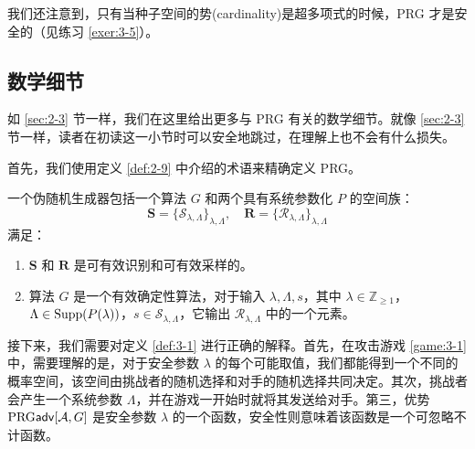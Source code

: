 我们还注意到，只有当种子空间的势(cardinality)是超多项式的时候，PRG 才是安全的（见练习 \ref{exer:3-5}）。

\subsection{数学细节}

如 \ref{sec:2-3} 节一样，我们在这里给出更多与 PRG 有关的数学细节。就像 \ref{sec:2-3} 节一样，读者在初读这一小节时可以安全地跳过，在理解上也不会有什么损失。

首先，我们使用定义 \ref{def:2-9} 中介绍的术语来精确定义 PRG。

\begin{definition}[伪随机生成器]
一个伪随机生成器包括一个算法 $G$ 和两个具有系统参数化 $P$ 的空间族：
\[
\mathbf{S}=\{\mathcal{S}_{\lambda,\Lambda}\}_{\lambda,\Lambda},\quad
\mathbf{R}=\{\mathcal{R}_{\lambda,\Lambda}\}_{\lambda,\Lambda}
\]
满足：
\begin{enumerate}
	\item $\mathbf{S}$ 和 $\mathbf{R}$ 是可有效识别和可有效采样的。
	\item 算法 $G$ 是一个有效确定性算法，对于输入 $\lambda,\Lambda,s$，其中 $\lambda\in\mathbb{Z}_{\geq1}$，$\Lambda\in{\rm Supp}(P(\lambda))$，$s\in\mathcal{S}_{\lambda,\Lambda}$，它输出 $\mathcal{R}_{\lambda,\Lambda}$ 中的一个元素。
\end{enumerate}
\end{definition}

接下来，我们需要对定义 \ref{def:3-1} 进行正确的解释。首先，在攻击游戏 \ref{game:3-1} 中，需要理解的是，对于安全参数 $\lambda$ 的每个可能取值，我们都能得到一个不同的概率空间，该空间由挑战者的随机选择和对手的随机选择共同决定。其次，挑战者会产生一个系统参数 $\Lambda$，并在游戏一开始时就将其发送给对手。第三，优势 ${\rm PRG\mathsf{adv}}[\mathcal{A},G]$ 是安全参数 $\lambda$ 的一个函数，安全性则意味着该函数是一个可忽略不计函数。